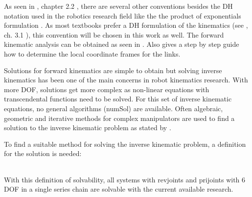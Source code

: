 As seen in 
\cite{MathIntroRobManip}, chapter 2.2
, there are several other conventions besides the \acrfull{DH} notation used in the robotics research field like the the product of exponentials formulation %
.
As most textbooks prefer a \ac{DH} formulation of the kinematics (see \cite{MathIntroRobManip}, ch. 3.1%
), this convention will be chosen in this work as well.
The forward kinematic analysis can be obtained as seen in %
\cite{ConstantinForwardKA}. Also \cite{DenavitHartenbergKonventionen} gives a step by step guide how to determine the local coordinate frames for the links.

Solutions for forward  kinematics are simple to obtain but solving inverse kinematics  has  been  one of  the  main  concerns  in  robot kinematics research. 
With more \ac{DOF}, solutions get more complex as non-linear equations with transcendental functions need to be solved. 
For this set of inverse kinematic equations, no general algorithms (\gls{numSol}) are available.
Often algebraic, geometric and iterative methods for complex manipulators are used to find a solution to the inverse kinematic problem as stated by %
\cite{FwdInvAnalysRobManip}.

To find a suitable method for solving the inverse kinematic problem, a definition for the solution is needed:\\
\medskip
\\
\bigskip

With this definition of solvability, all systems with \glspl{revjoint} and \glspl{prijoint} with 6 \ac{DOF}  in a single series chain are solvable with the current available research. \cite{invKinSeriallinkMani}
\\

